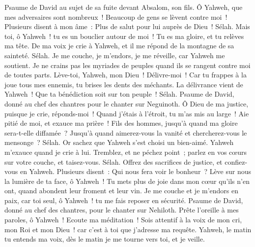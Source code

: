 \begin{multicols}{2}
\VerseOne{}Psaume de David au sujet de sa fuite devant Absalom, son fils.
Ô Yahweh, que mes adversaires sont nombreux~! Beaucoup de gens se lèvent contre moi~!
Plusieurs disent à mon âme~: Plus de salut pour lui auprès de Dieu~! Sélah.
Mais toi, ô Yahweh~! tu es un bouclier autour de moi~! Tu es ma gloire, et tu relèves ma tête.
De ma voix je crie à Yahweh, et il me répond de la montagne de sa sainteté. Sélah.
Je me couche, je m'endors, je me réveille, car Yahweh me soutient.
Je ne crains pas les myriades de peuples quand ils se rangent contre moi de toutes parts.
Lève-toi, Yahweh, mon Dieu~! Délivre-moi~! Car tu frappes à la joue tous mes ennemis, tu brises les dents des méchants.
La délivrance vient de Yahweh~! Que ta bénédiction soit sur ton peuple~! Sélah.
\VerseOne{}Psaume de David, donné au chef des chantres pour le chanter sur Neguinoth.
Ô Dieu de ma justice, puisque je crie, réponds-moi~! Quand j'étais à l'étroit, tu m'as mis au large~! Aie pitié de moi, et exauce ma prière~!
Fils des hommes, jusqu'à quand ma gloire sera-t-elle diffamée~? Jusqu'à quand aimerez-vous la vanité et chercherez-vous le mensonge~? Sélah.
Or sachez que Yahweh s'est choisi un bien-aimé. Yahweh m'exauce quand je crie à lui.
Tremblez, et ne péchez point~; parlez en vos cœurs sur votre couche, et taisez-vous. Sélah.
Offrez des sacrifices de justice, et confiez-vous en Yahweh.
Plusieurs disent~: Qui nous fera voir le bonheur~? Lève sur nous la lumière de ta face, ô Yahweh~!
Tu mets plus de joie dans mon cœur qu'ils n'en ont, quand abondent leur froment et leur vin.
Je me couche et je m'endors en paix, car toi seul, ô Yahweh~! tu me fais reposer en sécurité.
\VerseOne{}Psaume de David, donné au chef des chantres, pour le chanter sur Nehiloth.
Prête l'oreille à mes paroles, ô Yahweh~! Ecoute ma méditation~!
Sois attentif à la voix de mon cri, mon Roi et mon Dieu~! car c'est à toi que j'adresse ma requête.
Yahweh, le matin tu entends ma voix, dès le matin je me tourne vers toi, et je veille.

\end{multicols}
